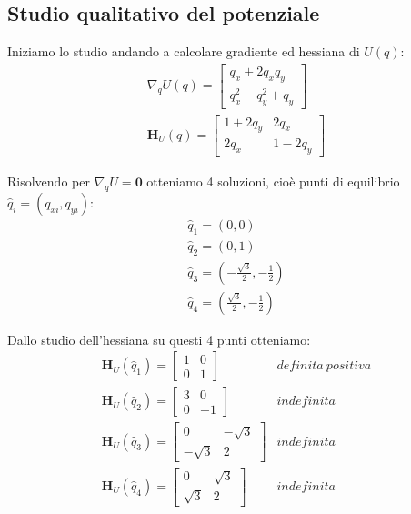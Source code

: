 \documentclass[a4paper, 12pt]{article}
\numberwithin{equation}{section}
\numberwithin{figure}{section}
\newcommand{\hess}[1]{\mathbf{H}_{#1}}
\begin{document}
\subsection{Studio qualitativo del potenziale}

Iniziamo lo studio andando a calcolare gradiente ed hessiana di $U(q)$:
\begin{eqnarray}
	\nabla_q U(q)= 
	\begin{bmatrix}
		q_x + 2q_xq_y\\
		q_x^2 - q_y^2 + q_y
	\end{bmatrix}\\[0.2cm]
% 
	\hess{U}(q)=
	\begin{bmatrix}
		1 + 2q_y & 2q_x\\
		2q_x & 1 - 2q_y
	\end{bmatrix}
\end{eqnarray}

Risolvendo per $\nabla_q U = \mathbf{0}$ otteniamo 4 soluzioni, cioè punti di equilibrio
$\hat{q}_i = (q_{xi}, q_{yi})$:
\begin{eqnarray*}
	\hat{q}_1 = (0,0)\\
	\hat{q}_2 = (0,1)\\
	\hat{q}_3 = (-\frac{\sqrt{3}}{2}, -\frac{1}{2})\\
	\hat{q}_4 = (\frac{\sqrt{3}}{2}, -\frac{1}{2})
\end{eqnarray*}

Dallo studio dell'hessiana su questi 4 punti otteniamo:
\begin{eqnarray*}
\hess{U}(\hat{q}_1) =
	\begin{bmatrix}
		1& 0\\ 0 & 1
	\end{bmatrix} &definita\ positiva\\
%
\hess{U}(\hat{q}_2) = 
	\begin{bmatrix}
		3 & 0 \\ 0 & -1	
	\end{bmatrix} &indefinita\\
%
\hess{U}(\hat{q}_3) = 
	\begin{bmatrix}
		0 & -\sqrt{3} \\
		-\sqrt{3} & 2
	\end{bmatrix}&indefinita\\
%
\hess{U}(\hat{q}_4) = 
	\begin{bmatrix}
		0 & \sqrt{3} \\
		\sqrt{3} & 2
	\end{bmatrix}&indefinita\\
\end{eqnarray*}
\end{document}
